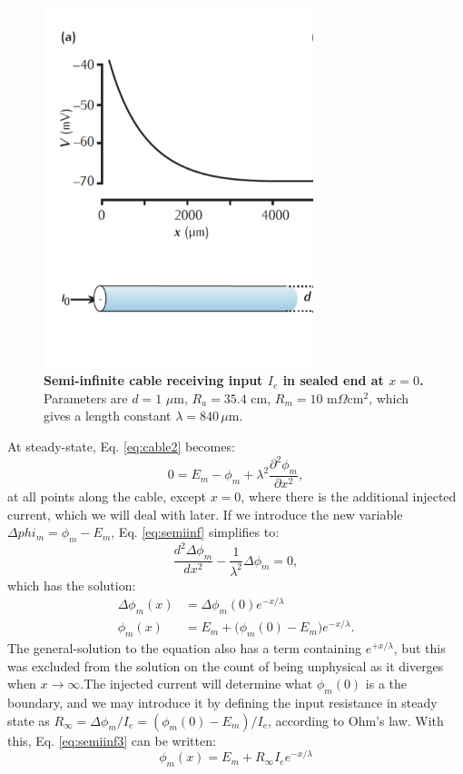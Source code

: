 \begin{figure}[!ht]
\begin{center}
\includegraphics[width=0.7\textwidth]{Figures/Neuron/Semiinf.png}
\end{center}
\caption{\textbf{Semi-infinite cable receiving input $I_e$ in sealed end at $x=0$.} Parameters are $d = 1$ $\mu$m, $R_a=35.4$ cm, $R_m = 10$ m$\Omega$cm$^2$, which gives a length constant $\lambda = 840\, \mu$m. }
\label{Neuron:fig:Semiinf}
\end{figure}

At steady-state, Eq. \ref{eq:cable2} becomes:
\begin{equation}
0 = E_m-\phi_m +  \lambda^2 \frac{\partial^2 \phi_m}{\partial x^2}, 
\label{eq:semiinf}
\end{equation}
at all points along the cable, except $x=0$, where there is the additional injected current, which we will deal with later. If we introduce the new variable $\Delta{phi_m}=\phi_m-E_m$, Eq. \ref{eq:semiinf} simplifies to:
\begin{equation}
\frac{d^2 \Delta{\phi_m}}{d x^2} -  \frac{1}{\lambda^2} \Delta{\phi_m}=0, 
\label{eq:semiinf2}
\end{equation}
which has the solution:
\begin{align}
\Delta{\phi_m}(x) &= \Delta{\phi_m}(0) e^{-x/\lambda} \\
\phi_m(x) &= E_m + \big( \phi_m(0)-E_m \big) e^{-x/\lambda}.
\label{eq:semiinf3}
\end{align}
The general-solution to the equation also has a term containing $e^{+x/\lambda}$, but this was excluded from the solution on the count of being unphysical as it diverges when $x \rightarrow \infty$.The injected current will determine what $\phi_m(0)$ is a the boundary, and we may introduce it by defining the input resistance in steady state as $R_{\infty} =  \Delta \phi_m/I_e =  (\phi_m(0)-E_m)/I_e$, according to Ohm's law. With this, Eq. \ref{eq:semiinf3} can be written:
\begin{equation}
\phi_m(x) = E_m + R_{\infty} I_e e^{-x/\lambda}
\label{eq:semiinf4}
\end{equation}


